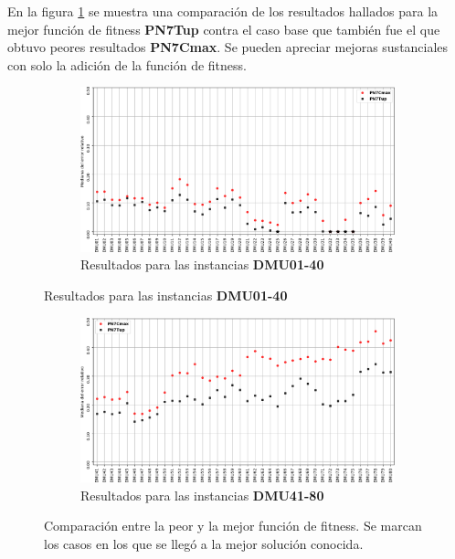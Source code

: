 En la figura \ref{fig:PN7CmaxvsPN7Tup} se muestra una comparación de los resultados hallados para la mejor función de fitness \textbf{PN7Tup} contra el caso base que también fue el que obtuvo peores resultados \textbf{PN7Cmax}. Se pueden apreciar mejoras sustanciales con solo la adición de la función de fitness.
\begin{figure}[hbtp]
    \begin{subfigure}{\textwidth}
        \centering
        \includegraphics[scale=.65]{Imagenes/PN7CmaxvsPN7Tup_1.png}
        \caption{Resultados para las instancias \textbf{DMU01-40}}
    \end{subfigure}
\end{figure}
\begin{figure}[H]\ContinuedFloat
    \begin{subfigure}{\textwidth}
        \centering
        \includegraphics[scale=.65]{Imagenes/PN7CmaxvsPN7Tup_2.png}
        \caption{Resultados para las instancias \textbf{DMU41-80}}
    \end{subfigure}
    \caption{Comparación entre la peor y la mejor función de fitness. Se marcan los casos en los que se llegó a la mejor solución conocida.}
    \label{fig:PN7CmaxvsPN7Tup}
\end{figure}


